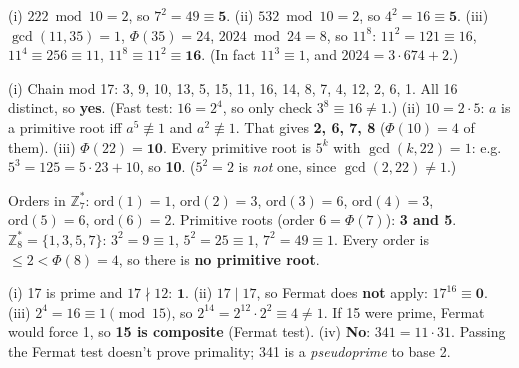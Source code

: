 \da (i) $222 \bmod 10 = 2$, so $7^2 = 49 \equiv \mathbf{5}$. (ii) $532 \bmod 10 = 2$, so $4^2 = 16 \equiv \mathbf{5}$.
(iii) $\gcd(11, 35) = 1$, $\Phi(35) = 24$, $2024 \bmod 24 = 8$, so $11^8$: $11^2 = 121 \equiv 16$, $11^4 \equiv 256 \equiv 11$, $11^8 \equiv 11^2 \equiv \mathbf{16}$. (In fact $11^3 \equiv 1$, and $2024 = 3\cdot674 + 2$.)

\da (i) Chain mod 17: 3, 9, 10, 13, 5, 15, 11, 16, 14, 8, 7, 4, 12, 2, 6, 1. All 16 distinct, so \textbf{yes}. (Fast test: $16 = 2^4$, so only check $3^8 \equiv 16 \ne 1$.)
(ii) $10 = 2\cdot5$: $a$ is a primitive root iff $a^5 \not\equiv 1$ and $a^2 \not\equiv 1$. That gives \textbf{2, 6, 7, 8} ($\Phi(10) = 4$ of them).
(iii) $\Phi(22) = \mathbf{10}$. Every primitive root is $5^k$ with $\gcd(k, 22) = 1$: e.g.\ $5^3 = 125 = 5\cdot23 + 10$, so \textbf{10}. ($5^2 = 2$ is \emph{not} one, since $\gcd(2, 22) \ne 1$.)

\da Orders in $\mathbb{Z}_7^*$: $\mathrm{ord}(1) = 1$, $\mathrm{ord}(2) = 3$, $\mathrm{ord}(3) = 6$, $\mathrm{ord}(4) = 3$, $\mathrm{ord}(5) = 6$, $\mathrm{ord}(6) = 2$. Primitive roots (order $6 = \Phi(7)$): \textbf{3 and 5}.
$\mathbb{Z}_8^* = \{1, 3, 5, 7\}$: $3^2 = 9 \equiv 1$, $5^2 = 25 \equiv 1$, $7^2 = 49 \equiv 1$. Every order is $\le 2 < \Phi(8) = 4$, so there is \textbf{no primitive root}.

\da (i) 17 is prime and $17 \nmid 12$: $\mathbf{1}$. (ii) $17 \mid 17$, so Fermat does \textbf{not} apply: $17^{16} \equiv \mathbf{0}$.
(iii) $2^4 = 16 \equiv 1 \pmod{15}$, so $2^{14} = 2^{12}\cdot2^2 \equiv 4 \ne 1$. If 15 were prime, Fermat would force 1, so \textbf{15 is composite} (Fermat test).
(iv) \textbf{No}: $341 = 11\cdot31$. Passing the Fermat test doesn't prove primality; 341 is a \emph{pseudoprime} to base 2.
